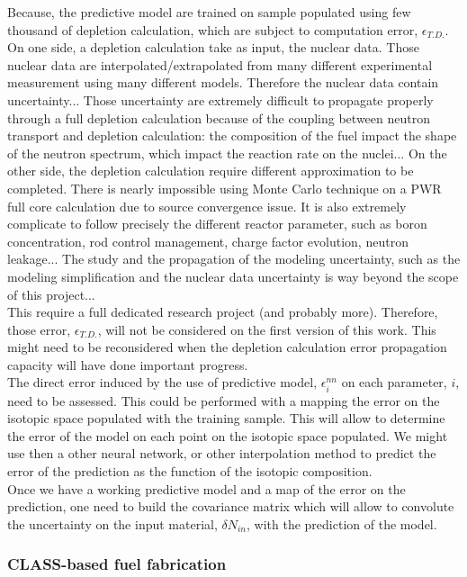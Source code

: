 \documentclass[dvips,12pt]{article}
\begin{document}
Because, the predictive model are trained on
sample populated using few thousand of depletion
calculation, which are subject to computation
error, $\epsilon_{T.D.}$. On one side, a depletion
calculation take as input, the nuclear data. Those
nuclear data are interpolated/extrapolated from
many different experimental measurement using many
different models. Therefore the nuclear data
contain uncertainty...  Those uncertainty are
extremely difficult to propagate properly through
a full depletion calculation because of the
coupling between neutron transport and depletion
calculation: the composition of the fuel impact
the shape of the neutron spectrum, which impact
the reaction rate on the nuclei... On the other
side, the depletion calculation require different
approximation to be completed. There is nearly
impossible using Monte Carlo technique on a PWR
full core calculation due to source convergence
issue. It is also extremely complicate to follow
precisely the different reactor parameter, such as
boron concentration, rod control management,
charge factor evolution, neutron leakage... The
study and the propagation of the modeling
uncertainty, such as the modeling simplification
and the nuclear data uncertainty is way beyond the
scope of this project...\\ 
This require a full dedicated research project
(and probably more). Therefore, those error,
$\epsilon_{T.D.}$, will not be considered on the
first version of this work. This might need to be
reconsidered when the depletion calculation error
propagation capacity will have done important
progress.\\
The direct error induced by the use of predictive
model, $\epsilon^{nn}_{i}$ on each parameter, $i$,
need to be assessed. This could be performed with
a mapping the error on the isotopic space
populated with the training sample. This will
allow to determine the error of the model on each
point on the isotopic space populated. We might
use then a other neural network, or other
interpolation method to predict the error of the
prediction as the function of the isotopic
composition.\\
Once we have a working predictive model and a map
of the error on the prediction, one need to build
the covariance matrix which will allow to
convolute the uncertainty on the input material,
$\delta N_{in}$, with the prediction of the
model.\\


\subsubsection{CLASS-based fuel fabrication} \label{sec:fabrication}
\end{document}
